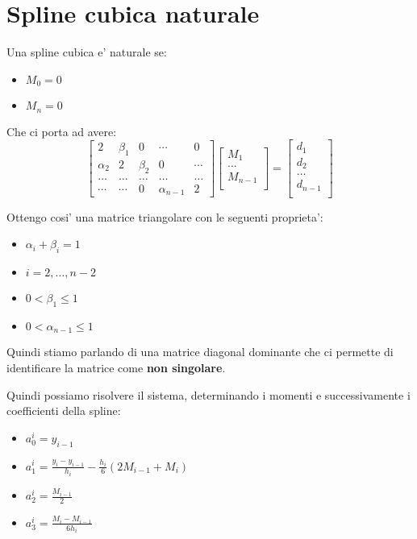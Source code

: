 \section{Spline cubica naturale}
Una spline cubica e' naturale se:
\begin{itemize}
  \item $M_0 = 0$
  \item $M_n = 0$
\end{itemize}
Che ci porta ad avere:
\begin{equation}
  \begin{bmatrix}
    2 & \beta_1 & 0 & \cdots  & 0 \\
    \alpha_2 & 2 & \beta_2 & 0 &  \cdots \\
    \dots& \dots& \dots& \dots& \dots\\
    \cdots & \cdots & 0 & \alpha_{n-1} & 2 
  \end{bmatrix}
  \begin{bmatrix}
    M_1 \\
    \dots \\
    M_{n-1} \\
  \end{bmatrix}
  =
  \begin{bmatrix}
    d_1 \\
    d_2 \\
    \dots \\
    d_{n-1} \\
  \end{bmatrix}
\end{equation}

Ottengo cosi' una matrice triangolare con le seguenti proprieta':
\begin{itemize}
  \item $\alpha_i + \beta_i = 1$  
  \item $i = 2 , \dots, n-2$  
  \item $0 < \beta_1 \leq 1$
  \item $0 < \alpha_{n-1} \leq 1$
\end{itemize}
Quindi stiamo parlando di una matrice diagonal dominante che ci permette di identificare la matrice come \textbf{non singolare}.

Quindi possiamo risolvere il sistema, determinando i momenti e successivamente i coefficienti della spline:
\begin{itemize}
  \item $a^i_0 = y_{i-1}$
  \item $a^i_1 = \frac{y_i - y_{i-1}}{h_i} - \frac{h_i}{6}(2M_{i-1} + M_i)$
  \item $a^i_2 = \frac{M_{i-1}}{2}$
  \item $a^i_3 = \frac{M_i - M_{i-1}}{6h_i}$
\end{itemize}

